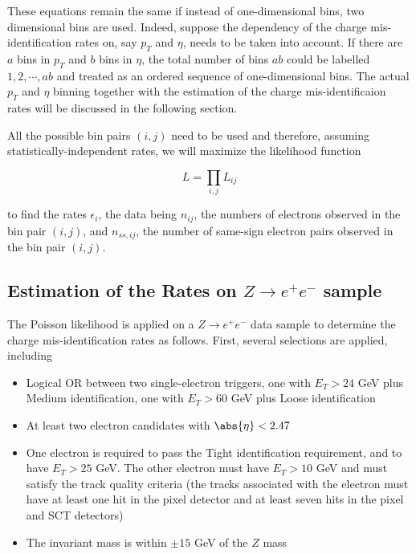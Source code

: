These equations remain the same if instead of one-dimensional bins, two
dimensional bins are used. Indeed, suppose the dependency of the charge
mis-identification rates on, say $p_T$ and $\eta$, needs to be taken into
account. If there are $a$ bins in $p_T$ and $b$ bins in $\eta$, the total
number of bins $ab$ could be labelled $1, 2, \cdots, ab$ and treated as an
ordered sequence of one-dimensional bins. The actual $p_T$ and $\eta$ binning
together with the estimation of the charge mis-identificaion rates will be
discussed in the following section.

All the possible bin pairs $(i,j)$ need to be used and therefore, assuming
statistically-independent rates, we will maximize the likelihood function

$$
	L = \prod_{i,j}L_{ij}
$$

to find the rates $\epsilon_i$, the data being $n_{ij}$, the numbers of
electrons observed in the bin pair $(i,j)$, and $n_{ss,ij}$, the number of
same-sign electron pairs observed in the bin pair $(i,j)$.


\subsection{Estimation of the Rates on $Z\to e^+e^-$ sample}\label{s:zeerates}

The Poisson likelihood is applied on a $Z\to e^+e^-$ data sample to determine
the charge mis-identification rates as follows. First, several selections are
applied, including

\begin{itemize}[label=]

	\item Logical OR between two single-electron triggers, one with $E_T > 24$ GeV
	      plus Medium identification, one with $E_T > 60$ GeV plus Loose identification

	\item At least two electron candidates with $\abs{\eta} < 2.47$

	\item One electron is required to pass the Tight identification requirement,
	      and to have $E_T > 25$ GeV. The other electron must have $E_T > 10$ GeV and
	      must satisfy the track quality criteria (the tracks associated with the
	      electron must have at least one hit in the pixel detector and at least seven
	      hits in the pixel and SCT detectors)

	\item The invariant mass is within $\pm 15$ GeV of the $Z$ mass
\end{itemize}

